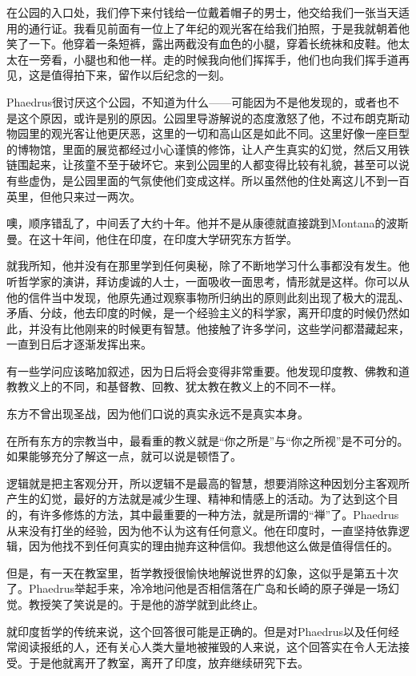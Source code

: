 \documentclass[UTF8]{article}
\begin{document}
\par 在公园的入口处，我们停下来付钱给一位戴着帽子的男士，他交给我们一张当天适用的通行证。我看见前面有一位上了年纪的观光客在给我们拍照，于是我就朝着他笑了一下。他穿着一条短裤，露出两截没有血色的小腿，穿着长统袜和皮鞋。他太太在一旁看，小腿也和他一样。走的时候我向他们挥挥手，他们也向我们挥手道再见，这是值得拍下来，留作以后纪念的一刻。
\par Phaedrus很讨厌这个公园，不知道为什么——可能因为不是他发现的，或者也不是这个原因，或许是别的原因。公园里导游解说的态度激怒了他，不过布朗克斯动物园里的观光客让他更厌恶，这里的一切和高山区是如此不同。这里好像一座巨型的博物馆，里面的展览都经过小心谨慎的修饰，让人产生真实的幻觉，然后又用铁链围起来，让孩童不至于破坏它。来到公园里的人都变得比较有礼貌，甚至可以说有些虚伪，是公园里面的气氛使他们变成这样。所以虽然他的住处离这儿不到一百英里，但他只来过一两次。
\par 噢，顺序错乱了，中间丢了大约十年。他并不是从康德就直接跳到Montana的波斯曼。在这十年间，他住在印度，在印度大学研究东方哲学。
\par 就我所知，他并没有在那里学到任何奥秘，除了不断地学习什么事都没有发生。他听哲学家的演讲，拜访虔诚的人士，一面吸收一面思考，情形就是这样。你可以从他的信件当中发现，他原先通过观察事物所归纳出的原则此刻出现了极大的混乱、矛盾、分歧，他去印度的时候，是一个经验主义的科学家，离开印度的时候仍然如此，并没有比他刚来的时候更有智慧。他接触了许多学问，这些学问都潜藏起来，一直到日后才逐渐发挥出来。
\par 有一些学问应该略加叙述，因为日后将会变得非常重要。他发现印度教、佛教和道教教义上的不同，和基督教、回教、犹太教在教义上的不同不一样。
\par 东方不曾出现圣战，因为他们口说的真实永远不是真实本身。
\par 在所有东方的宗教当中，最看重的教义就是“你之所是”与“你之所视”是不可分的。如果能够充分了解这一点，就可以说是顿悟了。
\par 逻辑就是把主客观分开，所以逻辑不是最高的智慧，想要消除这种因划分主客观所产生的幻觉，最好的方法就是减少生理、精神和情感上的活动。为了达到这个目的，有许多修炼的方法，其中最重要的一种方法，就是所谓的“禅”了。Phaedrus从来没有打坐的经验，因为他不认为这有任何意义。他在印度时，一直坚持依靠逻辑，因为他找不到任何真实的理由抛弃这种信仰。我想他这么做是值得信任的。
\par 但是，有一天在教室里，哲学教授很愉快地解说世界的幻象，这似乎是第五十次了。Phaedrus举起手来，冷冷地问他是否相信落在广岛和长崎的原子弹是一场幻觉。教授笑了笑说是的。于是他的游学就到此终止。
\par 就印度哲学的传统来说，这个回答很可能是正确的。但是对Phaedrus以及任何经常阅读报纸的人，还有关心人类大量地被摧毁的人来说，这个回答实在令人无法接受。于是他就离开了教室，离开了印度，放弃继续研究下去。
\end{document}
